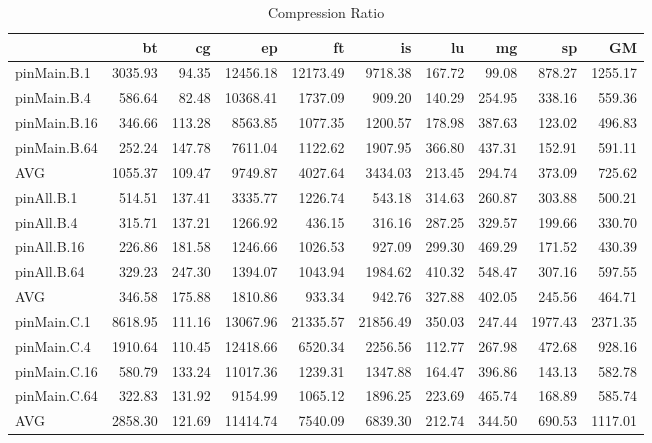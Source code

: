 \iffalse
\begin{table}[]
\caption{Compression Ratio}
\label{comet_cr_pMpA_BC_itn_p3.5}\begin{center}
\begin{tabular}{lrrrrrrrrr}
\hline
              &      bt &     cg &       ep &       ft &       is &     lu &     mg &      sp &      GM \\
\hline
 pinMain.B.1  & 3035.93 &  94.35 & 12456.18 & 12173.49 &  9718.38 & 167.72 &  99.08 &  878.27 & 1255.17 \\
 pinMain.B.4  &  586.64 &  82.48 & 10368.41 &  1737.09 &   909.20 & 140.29 & 254.95 &  338.16 &  559.36 \\
 pinMain.B.16 &  346.66 & 113.28 &  8563.85 &  1077.35 &  1200.57 & 178.98 & 387.63 &  123.02 &  496.83 \\
 pinMain.B.64 &  252.24 & 147.78 &  7611.04 &  1122.62 &  1907.95 & 366.80 & 437.31 &  152.91 &  591.11 \\
 AVG          & 1055.37 & 109.47 &  9749.87 &  4027.64 &  3434.03 & 213.45 & 294.74 &  373.09 &  725.62 \\
 pinAll.B.1   &  514.51 & 137.41 &  3335.77 &  1226.74 &   543.18 & 314.63 & 260.87 &  303.88 &  500.21 \\
 pinAll.B.4   &  315.71 & 137.21 &  1266.92 &   436.15 &   316.16 & 287.25 & 329.57 &  199.66 &  330.70 \\
 pinAll.B.16  &  226.86 & 181.58 &  1246.66 &  1026.53 &   927.09 & 299.30 & 469.29 &  171.52 &  430.39 \\
 pinAll.B.64  &  329.23 & 247.30 &  1394.07 &  1043.94 &  1984.62 & 410.32 & 548.47 &  307.16 &  597.55 \\
 AVG          &  346.58 & 175.88 &  1810.86 &   933.34 &   942.76 & 327.88 & 402.05 &  245.56 &  464.71 \\
 pinMain.C.1  & 8618.95 & 111.16 & 13067.96 & 21335.57 & 21856.49 & 350.03 & 247.44 & 1977.43 & 2371.35 \\
 pinMain.C.4  & 1910.64 & 110.45 & 12418.66 &  6520.34 &  2256.56 & 112.77 & 267.98 &  472.68 &  928.16 \\
 pinMain.C.16 &  580.79 & 133.24 & 11017.36 &  1239.31 &  1347.88 & 164.47 & 396.86 &  143.13 &  582.78 \\
 pinMain.C.64 &  322.83 & 131.92 &  9154.99 &  1065.12 &  1896.25 & 223.69 & 465.74 &  168.89 &  585.74 \\
 AVG          & 2858.30 & 121.69 & 11414.74 &  7540.09 &  6839.30 & 212.74 & 344.50 &  690.53 & 1117.01 \\

\end{tabular}
\end{center}
\end{table}
